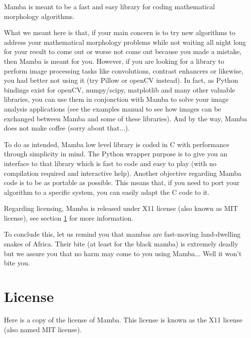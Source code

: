 \documentclass[a4paper,10pt,oneside]{article}
\begin{document}
Mamba is meant to be a fast and easy library for coding mathematical morphology 
algorithms.

What we meant here is that, if your main concern is to try new algorithms to 
address your mathematical morphology problems while not waiting all night long 
for your result to come out or worse not come out because you made a mistake, 
then Mamba is meant for you. However, if you are looking for a library to perform
image processing tasks like convolutions, contrast enhancers or likewise, you 
had better not using it (try Pillow or openCV instead). In fact, as Python bindings exist
for openCV, numpy/scipy, matplotlib and many other valuable libraries, you can
use them in conjonction with Mamba to solve your image analysis applications (see the
examples manual to see how images can be exchanged between Mamba and some of these libraries).
And by the way, Mamba does not make coffee (sorry about that...).

To do as intended, Mamba low level library is coded in C with performance through
simplicity in mind. The Python wrapper purpose is to give you an interface to 
that library which is fast to code and easy to play (with no compilation required 
and interactive help). Another objective regarding Mamba code is to be as 
portable as possible. This means that, if you need to port your algorithm to a 
specific system, you can easily adapt the C code to it.

Regarding licensing, Mamba is released under X11 license (also known as MIT 
license), see section \ref{cha:License} for more information.

To conclude this, let us remind you that mambas are fast-moving land-dwelling 
snakes of Africa. Their bite (at least for the black mamba) is extremely deadly 
but we assure you that no harm may come to you using Mamba... Well it won't bite
you.

\pagebreak

\section{License}
\label{cha:License}

Here is a copy of the license of Mamba. This license is known as the X11 license
(also named MIT license).

\vspace{0.5cm}
\end{document}
